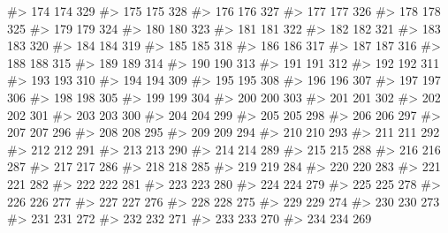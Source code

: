 \documentclass[
  letterpaper,
  DIV=11,
  numbers=noendperiod]{scrreprt}
\newenvironment{Shaded}{\begin{snugshade}}{\end{snugshade}}
\newcommand{\CommentTok}[1]{\textcolor[rgb]{0.37,0.37,0.37}{#1}}
\begin{document}
\begin{Shaded}
\begin{Highlighting}[]
\CommentTok{\#\textgreater{} 174 174  329}
\CommentTok{\#\textgreater{} 175 175  328}
\CommentTok{\#\textgreater{} 176 176  327}
\CommentTok{\#\textgreater{} 177 177  326}
\CommentTok{\#\textgreater{} 178 178  325}
\CommentTok{\#\textgreater{} 179 179  324}
\CommentTok{\#\textgreater{} 180 180  323}
\CommentTok{\#\textgreater{} 181 181  322}
\CommentTok{\#\textgreater{} 182 182  321}
\CommentTok{\#\textgreater{} 183 183  320}
\CommentTok{\#\textgreater{} 184 184  319}
\CommentTok{\#\textgreater{} 185 185  318}
\CommentTok{\#\textgreater{} 186 186  317}
\CommentTok{\#\textgreater{} 187 187  316}
\CommentTok{\#\textgreater{} 188 188  315}
\CommentTok{\#\textgreater{} 189 189  314}
\CommentTok{\#\textgreater{} 190 190  313}
\CommentTok{\#\textgreater{} 191 191  312}
\CommentTok{\#\textgreater{} 192 192  311}
\CommentTok{\#\textgreater{} 193 193  310}
\CommentTok{\#\textgreater{} 194 194  309}
\CommentTok{\#\textgreater{} 195 195  308}
\CommentTok{\#\textgreater{} 196 196  307}
\CommentTok{\#\textgreater{} 197 197  306}
\CommentTok{\#\textgreater{} 198 198  305}
\CommentTok{\#\textgreater{} 199 199  304}
\CommentTok{\#\textgreater{} 200 200  303}
\CommentTok{\#\textgreater{} 201 201  302}
\CommentTok{\#\textgreater{} 202 202  301}
\CommentTok{\#\textgreater{} 203 203  300}
\CommentTok{\#\textgreater{} 204 204  299}
\CommentTok{\#\textgreater{} 205 205  298}
\CommentTok{\#\textgreater{} 206 206  297}
\CommentTok{\#\textgreater{} 207 207  296}
\CommentTok{\#\textgreater{} 208 208  295}
\CommentTok{\#\textgreater{} 209 209  294}
\CommentTok{\#\textgreater{} 210 210  293}
\CommentTok{\#\textgreater{} 211 211  292}
\CommentTok{\#\textgreater{} 212 212  291}
\CommentTok{\#\textgreater{} 213 213  290}
\CommentTok{\#\textgreater{} 214 214  289}
\CommentTok{\#\textgreater{} 215 215  288}
\CommentTok{\#\textgreater{} 216 216  287}
\CommentTok{\#\textgreater{} 217 217  286}
\CommentTok{\#\textgreater{} 218 218  285}
\CommentTok{\#\textgreater{} 219 219  284}
\CommentTok{\#\textgreater{} 220 220  283}
\CommentTok{\#\textgreater{} 221 221  282}
\CommentTok{\#\textgreater{} 222 222  281}
\CommentTok{\#\textgreater{} 223 223  280}
\CommentTok{\#\textgreater{} 224 224  279}
\CommentTok{\#\textgreater{} 225 225  278}
\CommentTok{\#\textgreater{} 226 226  277}
\CommentTok{\#\textgreater{} 227 227  276}
\CommentTok{\#\textgreater{} 228 228  275}
\CommentTok{\#\textgreater{} 229 229  274}
\CommentTok{\#\textgreater{} 230 230  273}
\CommentTok{\#\textgreater{} 231 231  272}
\CommentTok{\#\textgreater{} 232 232  271}
\CommentTok{\#\textgreater{} 233 233  270}
\CommentTok{\#\textgreater{} 234 234  269}

\end{Highlighting}
\end{Shaded}
\end{document}
